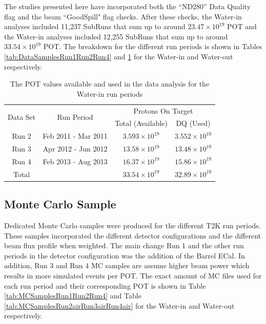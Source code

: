 The studies presented here have incorporated 
both the ``ND280'' Data Quality flag and the beam ``GoodSpill" flag checks. 
After these checks, the Water-in analyses included 11,237 SubRuns 
that sum up to around $23.47\times 10^{19}$ POT and 
the Water-in analyses included 12,255 SubRuns 
that sum up to around $33.54\times 10^{19}$ POT.
The breakdown for the different run periods is shown 
in Tables \ref{tab:DataSamplesRun1Run2Run4} 
and \ref{tab:DataSamplesRun2airRun3airRun4air} for the 
Water-in and Water-out respectively. \\

\begin{table}[h]
\centering
\begin{tabular}{cccc}\toprule
\multirow{2}{*}{Data Set} & \multirow{2}{*}{Run Period} & \multicolumn{2}{c}{Protons On Target}\\
 & & Total (Available) & DQ (Used) \\
\hline
Run 2 & Feb 2011 - Mar 2011 & $3.593\times 10^{19}$ & $3.552 \times 10^{19}$\\ 
Run 3 & Apr 2012 - Jun 2012 & $13.58\times 10^{19}$ & $13.48 \times 10^{19}$\\ 
Run 4 & Feb 2013 - Aug 2013 & $16.37\times 10^{19}$ & $15.86 \times 10^{19}$\\ 
\hline
Total &  & $33.54 \times 10^{19}$ & $32.89 \times 10^{19}$ \\ 
\bottomrule
\end{tabular} 
\caption{The POT values available and used in the data analysis for 
the Water-in run periods}
\label{tab:DataSamplesRun2airRun3airRun4air} %
\end{table}

\subsection{Monte Carlo Sample} 

Dedicated Monte Carlo samples were 
produced for the different T2K run periods. 
These samples incorporated the different detector configurations 
and the different beam flux profile when weighted.
The main change Run 1 and the other run periods 
in the detector configuration was the addition
of the Barrel ECal.
In addition, Run 3 and Run 4 MC samples are assume higher beam power 
which results in more simulated events per POT.
The exact amount of MC files used for each run period and their 
corresponding POT is shown in Table \ref{tab:MCSamplesRun1Run2Run4} and 
Table \ref{tab:MCSamplesRun2airRun3airRun4air} 
for the Water-in and Water-out respectively. \\

